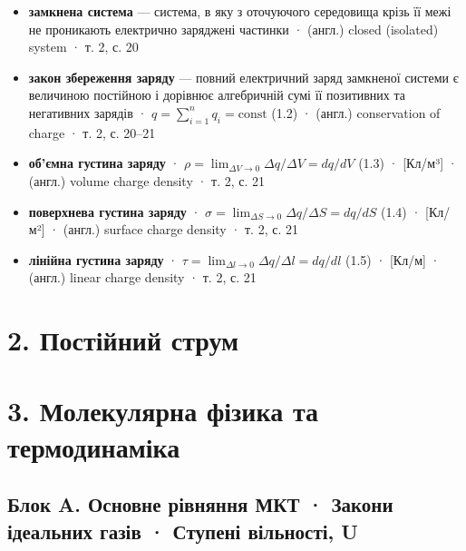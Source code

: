 \documentclass[11pt,a4paper,oneside]{book}
\newcommand{\book}{}
\begin{document}
\begin{itemize}
\item \textbf{замкнена система} — система, в яку з оточуючого середовища крізь її межі не проникають електрично заряджені частинки · (англ.) closed (isolated) system · \book{} т. 2, с. 20
\item \textbf{закон збереження заряду} — повний електричний заряд замкненої системи є величиною постійною і дорівнює алгебричній сумі її позитивних та негативних зарядів · $q = \sum_{i=1}^{n} q_i = \text{const}$ (1.2) · (англ.) conservation of charge · \book{} т. 2, с. 20–21
\item \textbf{об'ємна густина заряду} · $\rho = \lim_{\Delta V\to0} \Delta q/\Delta V = dq/dV$ (1.3) · [Кл/м³] · (англ.) volume charge density · \book{} т. 2, с. 21
\item \textbf{поверхнева густина заряду} · $\sigma = \lim_{\Delta S\to0} \Delta q/\Delta S = dq/dS$ (1.4) · [Кл/м²] · (англ.) surface charge density · \book{} т. 2, с. 21
\item \textbf{лінійна густина заряду} · $\tau = \lim_{\Delta l\to0} \Delta q/\Delta l = dq/dl$ (1.5) · [Кл/м] · (англ.) linear charge density · \book{} т. 2, с. 21
\end{itemize}

\section*{2. Постійний струм}

\section*{3. Молекулярна фізика та термодинаміка}

\subsection*{Блок A. Основне рівняння МКТ · Закони ідеальних газів · Ступені вільності, U}
\end{document}
